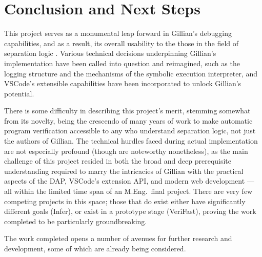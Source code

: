 
\chapter{Conclusion and Next Steps}\label{sec:conclusion}

This project serves as a monumental leap forward in Gillian's debugging
capabilities, and as a result, its overall usability to the those in the field
of separation logic . Various technical decisions underpinning Gillian's
implementation have been called into question and reimagined, such as the
logging structure and the mechanisms of the symbolic execution interpreter, and
VSCode's extensible capabilities have been incorporated to unlock Gillian's
potential.

There is some difficulty in describing this project's merit, stemming somewhat
from its novelty, being the crescendo of many years of work to make automatic
program verification accessible to any who understand separation logic, not just
the authors of Gillian. The technical hurdles faced during actual implementation
are not especially profound (though are noteworthy nonetheless), as the main
challenge of this project resided in both the broad and deep prerequisite
understanding required to marry the intricacies of Gillian with the practical
aspects of the DAP, VSCode's extension API, and modern web development --- all
within the limited time span of an M.Eng.\ final project. There are very few
competing projects in this space; those that do exist either have significantly
different goals (Infer), or exist in a prototype stage (VeriFast), proving the
work completed to be particularly groundbreaking.

The work completed opens a number of avenues for further research and
development, some of which are already being considered.



